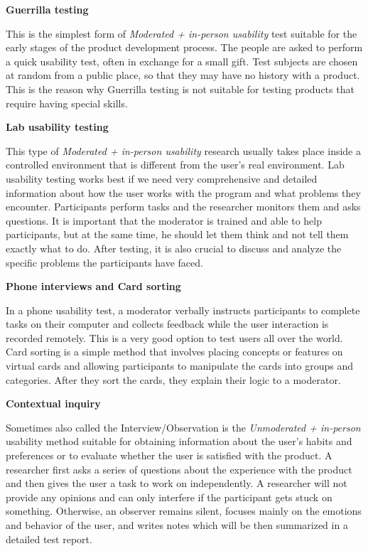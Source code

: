 \documentclass[a4paper,10pt,twoside]{article}
\begin{document}
\noindent \textbf {Guerrilla testing}

\noindent This is the simplest form of \textit{Moderated + in-person usability}
test suitable for the early stages of the product development process. The
people are asked to perform a quick usability test, often in exchange
for a small gift. Test subjects are chosen at random from a public
place, so that they may have no history with a product. This is the
reason why Guerrilla testing is not suitable for testing products that
require having special skills.

\bigskip

\noindent \textbf {Lab usability testing}

\noindent This type of \textit{Moderated + in-person usability} research
usually takes place inside a controlled environment that is different
from the user’s real environment. Lab usability testing works best if
we need very comprehensive and detailed information about how the user
works with the program and what problems they encounter. Participants
perform tasks and the researcher monitors them and asks questions. It
is important that the moderator is trained and able to help
participants, but at the same time, he should let them think and not
tell them exactly what to do. After testing, it is also crucial to
discuss and analyze the specific problems the participants have faced.

\bigskip

\noindent \textbf {Phone interviews and Card sorting}

\noindent In a phone usability test, a moderator verbally instructs
participants to complete tasks on their computer and collects feedback
while the user interaction is recorded remotely. This is a very good
option to test users all over the world. Card sorting is a simple
method that involves placing concepts or features on virtual cards and
allowing participants to manipulate the cards into groups and
categories. After they sort the cards, they explain their logic to a
moderator.

\bigskip

\noindent \textbf {Contextual inquiry}

\noindent Sometimes also called the Interview/Observation is the
\textit{Unmoderated + in-person} usability method suitable for
obtaining information about the user's habits and preferences or to
evaluate whether the user is satisfied with the product. A researcher
first asks a series of questions about the experience with the product
and then gives the user a task to work on independently. A researcher
will not provide any opinions and can only interfere if the
participant gets stuck on something. Otherwise, an observer remains
silent, focuses mainly on the emotions and behavior of the user, and
writes notes which will be then summarized in a detailed test report.
\end{document}
